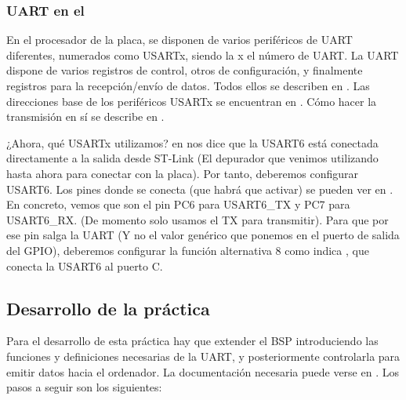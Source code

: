 \documentclass[../main.tex]{subfiles}
\begin{document}
        \subsubsection{UART en el \MCU}

            En el procesador de la placa, se disponen de varios periféricos de UART diferentes, numerados como USARTx, siendo la x el número de UART. La UART dispone de varios registros de control, otros de configuración, y finalmente registros para la recepción/envío de datos. Todos ellos se describen en \REFMAN[27.8]. Las direcciones base de los periféricos USARTx se encuentran en \REFMAN[1.6.2]. Cómo hacer la transmisión en sí se describe en \REFMAN[27.5.2].

            ¿Ahora, qué USARTx utilizamos? en \BRDMAN[5.13] nos dice que la USART6 está conectada directamente a la salida desde ST-Link (El depurador que venimos utilizando hasta ahora para conectar con la placa). Por tanto, deberemos configurar USART6. Los pines donde se conecta (que habrá que activar) se pueden ver en \DSMAN[Table 10]. En concreto, vemos que son el pin PC6 para USART6\_TX y PC7 para USART6\_RX. (De momento solo usamos el TX para transmitir). Para que por ese pin salga la UART (Y no el valor genérico que ponemos en el puerto de salida del GPIO), deberemos configurar la función alternativa 8 como indica \DSMAN[Table 12], que conecta la USART6 al puerto C.

    \subsection{Desarrollo de la práctica}

        Para el desarrollo de esta práctica hay que extender el BSP introduciendo las funciones y definiciones necesarias de la UART, y posteriormente controlarla para emitir datos hacia el ordenador. La documentación necesaria puede verse en \REFMAN[27]. Los pasos a seguir son los siguientes:
\end{document}

